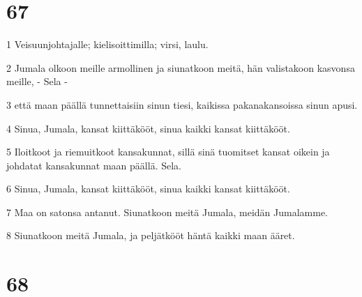 \chapter{67}

\par 1 Veisuunjohtajalle; kielisoittimilla; virsi, laulu.
\par 2 Jumala olkoon meille armollinen ja siunatkoon meitä, hän valistakoon kasvonsa meille, - Sela -
\par 3 että maan päällä tunnettaisiin sinun tiesi, kaikissa pakanakansoissa sinun apusi.
\par 4 Sinua, Jumala, kansat kiittäkööt, sinua kaikki kansat kiittäkööt.
\par 5 Iloitkoot ja riemuitkoot kansakunnat, sillä sinä tuomitset kansat oikein ja johdatat kansakunnat maan päällä. Sela.
\par 6 Sinua, Jumala, kansat kiittäkööt, sinua kaikki kansat kiittäkööt.
\par 7 Maa on satonsa antanut. Siunatkoon meitä Jumala, meidän Jumalamme.
\par 8 Siunatkoon meitä Jumala, ja peljätkööt häntä kaikki maan ääret.

\chapter{68}

